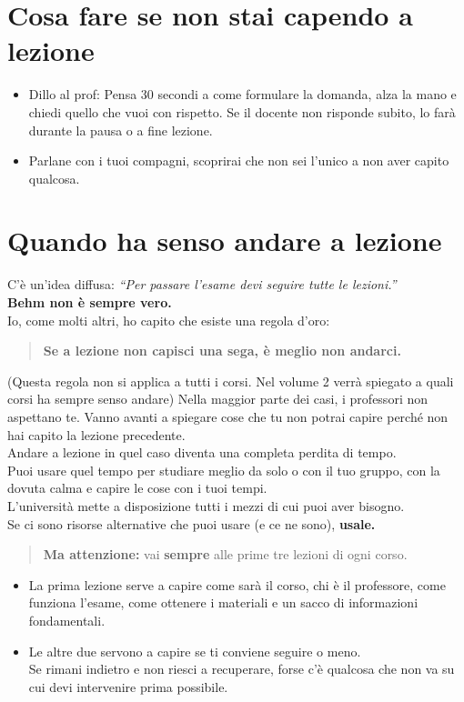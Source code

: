 \documentclass[18pt]{extarticle}
\begin{document}
\section{Cosa fare se non stai capendo a lezione}
\begin{itemize}
\item Dillo al prof: Pensa 30 secondi a come formulare la domanda, alza la mano e chiedi quello che vuoi con rispetto.  
  Se il docente non risponde subito, lo farà durante la pausa o a fine lezione.
\item Parlane con i tuoi compagni, scoprirai che non sei l'unico a non aver capito qualcosa.
\end{itemize}


\section{Quando ha senso andare a lezione}
C'è un'idea diffusa: \textit{``Per passare l'esame devi seguire tutte le lezioni.''}\\
\textbf{Behm non è sempre vero.}\\
Io, come molti altri, ho capito che esiste una regola d'oro:
\begin{quote}
\textbf{Se a lezione non capisci una sega, è meglio non andarci.}
\end{quote}%
(Questa regola non si applica a tutti i corsi. Nel volume 2 verrà spiegato a quali corsi ha sempre senso andare)
Nella maggior parte dei casi, i professori non aspettano te. Vanno avanti a spiegare cose che tu non potrai capire perché non hai capito la lezione precedente.\\
Andare a lezione in quel caso diventa una completa perdita di tempo.\\
Puoi usare quel tempo per studiare meglio da solo o con il tuo gruppo, con la dovuta calma e capire le cose con i tuoi tempi.\\
L'università mette a disposizione tutti i mezzi di cui puoi aver bisogno.\\
Se ci sono risorse alternative che puoi usare (e ce ne sono), \textbf{usale.}
\begin{quote}
\textbf{Ma attenzione:} vai \textbf{sempre} alle prime tre lezioni di ogni corso.
\end{quote}
\begin{itemize}
\item La prima lezione serve a capire come sarà il corso, chi è il professore, come funziona l'esame, come ottenere i materiali e un sacco di informazioni fondamentali.
\item Le altre due servono a capire se ti conviene seguire o meno.\\
   Se rimani indietro e non riesci a recuperare, forse c'è qualcosa che non va su cui devi intervenire prima possibile.
\end{itemize}
\end{document}
